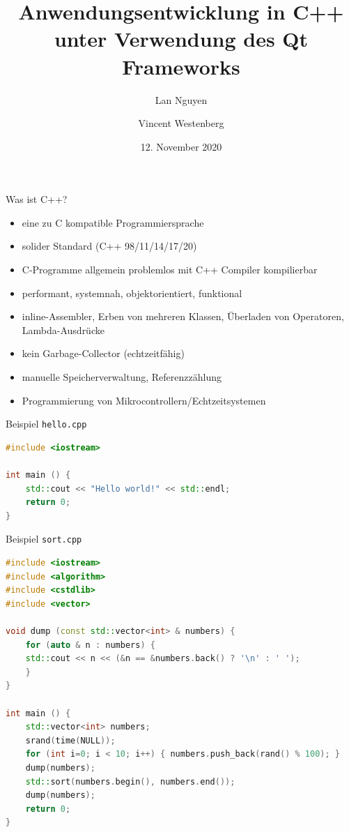 \documentclass[aspectratio=169]{beamer}
\title{Anwendungsentwicklung in C++ unter Verwendung des Qt Frameworks}
\author{Lan Nguyen \and Vincent Westenberg}
\institute{Berufsakademie Sachsen -- Staatliche Studienakademie Leipzig}
\date{12. November 2020}
\begin{document}

\begin{frame}
\titlepage
\end{frame}


\begin{frame}{Was ist C++?}
\begin{itemize}
\item eine zu C kompatible Programmiersprache
\item solider Standard (C++ 98/11/14/17/20)
\item[\ding{237}] C-Programme allgemein problemlos mit C++ Compiler kompilierbar
\item performant, systemnah, objektorientiert, funktional
\item[\ding{237}] inline-Assembler, Erben von mehreren Klassen, Überladen von Operatoren, Lambda-Ausdrücke
\item kein Garbage-Collector (echtzeitfähig)
\item[\ding{237}] manuelle Speicherverwaltung, Referenzzählung
\item[\ding{237}] Programmierung von Mikrocontrollern/Echtzeitsystemen
\end{itemize}
\end{frame}


\begin{frame}[fragile]{Beispiel \texttt{hello.cpp}}
\begin{lstlisting}[language=C++]
#include <iostream>

int main () {
    std::cout << "Hello world!" << std::endl;
    return 0;
}
\end{lstlisting}
\end{frame}


\begin{frame}[fragile]{Beispiel \texttt{sort.cpp}}
\scriptsize
\vspace*{-5pt}
\begin{lstlisting}[language=C++]
#include <iostream>
#include <algorithm>
#include <cstdlib>
#include <vector>

void dump (const std::vector<int> & numbers) {
    for (auto & n : numbers) {
	std::cout << n << (&n == &numbers.back() ? '\n' : ' ');
    }
}

int main () {
    std::vector<int> numbers;
    srand(time(NULL));
    for (int i=0; i < 10; i++) { numbers.push_back(rand() % 100); }
    dump(numbers);
    std::sort(numbers.begin(), numbers.end());
    dump(numbers);
    return 0;
}
\end{lstlisting}
\end{frame}
\end{document}
